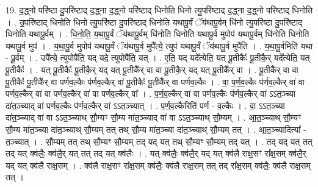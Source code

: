 \documentclass[17pt]{extarticle}
\begin{document}
19. द॒द्ध्नो परि॑ष्टा दु॒परि॑ष्टाद् द॒द्ध्ना द॒द्ध्नो परि॑ष्टाद् धिनोति धिनो त्यु॒परि॑ष्टाद् द॒द्ध्ना द॒द्ध्नो परि॑ष्टाद् धिनोति । . उ॒परि॑ष्टाद् धिनोति धिनो त्यु॒परि॑ष्टा दु॒परि॑ष्टाद् धिनोति यथापू॒र्वं ॅय॑थापू॒र्वम् धि॑नो त्यु॒परि॑ष्टा दु॒परि॑ष्टाद् धिनोति यथापू॒र्वम् । . धि॒नो॒ति॒ य॒था॒पू॒र्वं ॅय॑थापू॒र्वम् धि॑नोति धिनोति यथापू॒र्व मुपोप॑ यथापू॒र्वम् धि॑नोति धिनोति यथापू॒र्व मुप॑ । . य॒था॒पू॒र्व मुपोप॑ यथापू॒र्वं ॅय॑थापू॒र्व मुपै᳚त्ये॒ त्युप॑ यथापू॒र्वं ॅय॑थापू॒र्व मुपै॑ति । . य॒था॒पू॒र्वमिति॑ यथा - पू॒र्वम् । . उपै᳚त्ये॒ त्युपोपै॑ति॒ यद् यदे॒ त्युपोपै॑ति॒ यत् । . ए॒ति॒ यद् यदे᳚त्येति॒ यत् पू॒तीकैः᳚ पू॒तीकै॒र् यदे᳚त्येति॒ यत् पू॒तीकैः᳚ । . यत् पू॒तीकैः᳚ पू॒तीकै॒र् यद् यत् पू॒तीकै᳚र् वा वा पू॒तीकै॒र् यद् यत् पू॒तीकै᳚र् वा । . पू॒तीकै᳚र् वा वा पू॒तीकैः᳚ पू॒तीकै᳚र् वा पर्णव॒ल्कैः प॑र्णव॒ल्कैर् वा॑ पू॒तीकैः᳚ पू॒तीकै᳚र् वा पर्णव॒ल्कैः । . वा॒ प॒र्ण॒व॒ल्कैः प॑र्णव॒ल्कैर् वा॑ वा पर्णव॒ल्कैर् वा॑ वा पर्णव॒ल्कैर् वा॑ वा पर्णव॒ल्कैर् वा᳚ । . प॒र्ण॒व॒ल्कैर् वा॑ वा पर्णव॒ल्कैः प॑र्णव॒ल्कैर् वा॑ ऽऽत॒ञ्च्या दा॑त॒ञ्च्याद् वा॑ पर्णव॒ल्कैः प॑र्णव॒ल्कैर् वा॑ ऽऽत॒ञ्च्यात् । . प॒र्ण॒व॒ल्कैरिति॑ पर्ण - व॒ल्कैः । . वा॒ ऽऽत॒ञ्च्या दा॑त॒ञ्च्याद् वा॑ वा ऽऽत॒ञ्च्याथ् सौ॒म्यꣳ सौ॒म्य मा॑त॒ञ्च्याद् वा॑ वा ऽऽत॒ञ्च्याथ् सौ॒म्यम् । . आ॒त॒ञ्च्याथ् सौ॒म्यꣳ सौ॒म्य मा॑त॒ञ्च्या दा॑त॒ञ्च्याथ् सौ॒म्यम् तत् तथ् सौ॒म्य मा॑त॒ञ्च्या दा॑त॒ञ्च्याथ् सौ॒म्यम् तत् । . आ॒त॒ञ्च्यादित्या᳚ - त॒ञ्च्यात् । . सौ॒म्यम् तत् तथ् सौ॒म्यꣳ सौ॒म्यम् तद् यद् यत् तथ् सौ॒म्यꣳ सौ॒म्यम् तद् यत् । . तद् यद् यत् तत् तद् यत् क्व॑लैः॒ क्व॑लै॒र् यत् तत् तद् यत् क्व॑लैः । . यत् क्व॑लैः॒ क्व॑लै॒र् यद् यत् क्व॑लै राक्ष॒सꣳ रा᳚क्ष॒सम् क्व॑लै॒र् यद् यत् क्व॑लै राक्ष॒सम् । . क्व॑लै राक्ष॒सꣳ रा᳚क्ष॒सम् क्व॑लैः॒ क्व॑लै राक्ष॒सम् तत् तद् रा᳚क्ष॒सम् क्व॑लैः॒ क्व॑लै राक्ष॒सम् तत् । \newline
\end{document}
